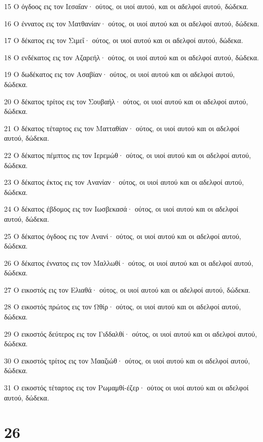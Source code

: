 \par 15 Ο όγδοος εις τον Ιεσαΐαν· ούτος, οι υιοί αυτού, και οι αδελφοί αυτού, δώδεκα.
\par 16 Ο έννατος εις τον Ματθανίαν· ούτος, οι υιοί αυτού και οι αδελφοί αυτού, δώδεκα.
\par 17 Ο δέκατος εις τον Σιμεΐ· ούτος, οι υιοί αυτού και οι αδελφοί αυτού, δώδεκα.
\par 18 Ο ενδέκατος εις τον Αζαρεήλ· ούτος, οι υιοί αυτού και οι αδελφοί αυτού, δώδεκα.
\par 19 Ο δωδέκατος εις τον Ασαβίαν· ούτος, οι υιοί αυτού και οι αδελφοί αυτού, δώδεκα.
\par 20 Ο δέκατος τρίτος εις τον Σουβαήλ· ούτος, οι υιοί αυτού και οι αδελφοί αυτού, δώδεκα.
\par 21 Ο δέκατος τέταρτος εις τον Ματταθίαν· ούτος, οι υιοί αυτού και οι αδελφοί αυτού, δώδεκα.
\par 22 Ο δέκατος πέμπτος εις τον Ιερεμώθ· ούτος, οι υιοί αυτού και οι αδελφοί αυτού, δώδεκα.
\par 23 Ο δέκατος έκτος εις τον Ανανίαν· ούτος, οι υιοί αυτού και οι αδελφοί αυτού, δώδεκα.
\par 24 Ο δέκατος έβδομος εις τον Ιωσβεκασά· ούτος, οι υιοί αυτού και οι αδελφοί αυτού, δώδεκα.
\par 25 Ο δέκατος όγδοος εις τον Ανανί· ούτος, οι υιοί αυτού και οι αδελφοί αυτού, δώδεκα.
\par 26 Ο δέκατος έννατος εις τον Μαλλωθί· ούτος, οι υιοί αυτού και οι αδελφοί αυτού, δώδεκα.
\par 27 Ο εικοστός εις τον Ελιαθά· ούτος, οι υιοί αυτού και οι αδελφοί αυτού, δώδεκα.
\par 28 Ο εικοστός πρώτος εις τον Ωθίρ· ούτος, οι υιοί αυτού και οι αδελφοί αυτού, δώδεκα.
\par 29 Ο εικοστός δεύτερος εις τον Γιδδαλθί· ούτος, οι υιοί αυτού και οι αδελφοί αυτού, δώδεκα.
\par 30 Ο εικοστός τρίτος εις τον Μααζιώθ· ούτος, οι υιοί αυτού και οι αδελφοί αυτού, δώδεκα.
\par 31 Ο εικοστός τέταρτος εις τον Ρωμαμθί-έζερ· ούτος οι υιοί αυτού και οι αδελφοί αυτού, δώδεκα.

\chapter{26}

